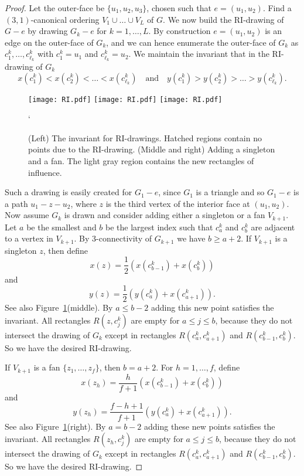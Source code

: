 \documentclass[12pt]{article}
\begin{document}
\begin{proof}
Let the outer-face be $\{u_1,u_2,u_3\}$, chosen such that $e=(u_1,u_2)$.
Find a $(3,1)$-canonical ordering $V_1\cup \dots\cup V_L$ of $G$.  We
now build the RI-drawing of $G-e$ by drawing $G_k-e$ for $k=1,\dots,L$.
By construction $e=(u_1,u_2)$ is an edge on the outer-face of $G_k$, and
we can hence enumerate the outer-face of $G_k$ as $c^k_1,\dots,c^k_{\ell_k}$
with $c^k_1=u_1$ and $c^k_{\ell_k}=u_2$.  
We maintain the invariant
that in the RI-drawing of $G_k$
$$x(c^k_1)<x(c^k_2)< \dots < x(c^k_{\ell_k}) \quad \mbox{and} \quad
y(c^k_1)>y(c^k_2)> \dots > y(c^k_{\ell_k}).$$
\begin{figure}[ht]
\hspace*{\fill}
\texttt{[image: RI.pdf]}
\hspace*{\fill}
\texttt{[image: RI.pdf]}
\hspace*{\fill}
\texttt{[image: RI.pdf]}
\hspace*{\fill}
\caption{(Left) The invariant for RI-drawings.  Hatched regions contain no points due to the RI-drawing.  (Middle and right) Adding a singleton
and a fan.  The light gray region contains the new rectangles of influence.}
\label{fig:RI}`
\end{figure}

Such a drawing is easily created for $G_1-e$, since $G_1$ is a triangle and
so $G_1-e$ is a path $u_1-z-u_2$, where $z$ is the third vertex
of the interior face at $(u_1,u_2)$.
Now assume $G_k$ is drawn and consider adding either
a singleton or a fan $V_{k+1}$.  Let $a$ be the smallest and $b$ be the
largest index such that $c^k_a$ and $c^k_b$ are adjacent to a vertex in $V_{k+1}$.
By 3-connectivity of $G_{k+1}$ we have $b\geq a+2$.
If $V_{k+1}$ is a singleton $z$, then 
define 
$$x(z)= \frac{1}{2}\left(x(c^k_{b-1})+x(c^k_b)\right)$$
and $$y(z)= \frac{1}{2}\left(y(c^k_{a})+x(c^k_{a+1})\right).$$  See also
Figure~\ref{fig:RI}(middle).  By $a\leq b-2$ adding this new point satisfies
the invariant.
All rectangles $R(z,c^k_j)$ are empty for $a\leq j\leq b$, because they do not intersect
the drawing of $G_k$ except in rectangles $R(c^k_a,c^k_{a+1})$ and $R(c^k_{b-1},c^k_b)$.
So we have the desired RI-drawing.

If $V_{k+1}$ is a fan $\{z_1,\dots,z_f\}$, then $b=a+2$.
For $h=1,\dots,f$, define $$x(z_h)= \frac{h}{f+1}\left(x(c^k_{b-1})+x(c^k_b)\right)$$
and $$y(z_h)= \frac{f-h+1}{f+1}\left(y(c^k_{a})+x(c^k_{a+1})\right).$$  See also
Figure~\ref{fig:RI}(right).  By $a=b-2$ adding these new points satisfies the invariant.
All rectangles $R(z_h,c^k_j)$ are empty for $a\leq j\leq b$, because they do not intersect
the drawing of $G_k$ except in rectangles $R(c^k_a,c^k_{a+1})$ and $R(c^k_{b-1},c^k_b)$.
So we have the desired RI-drawing.
\end{proof}
\end{document}
